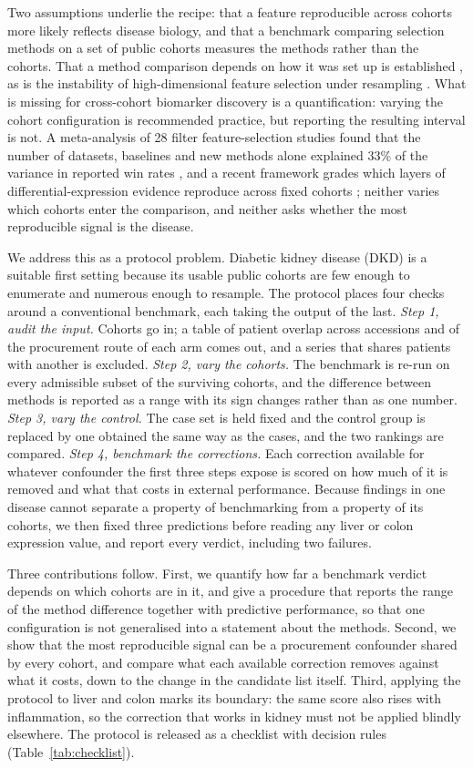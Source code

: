 \documentclass[unnumsec,webpdf,contemporary,large,numbered]{oup-authoring-template}
\begin{document}
Two assumptions underlie the recipe: that a feature reproducible across cohorts more likely
reflects disease biology, and that a benchmark comparing selection methods on a set of public
cohorts measures the methods rather than the cohorts. That a method comparison depends on how it
was set up is established \cite{boulesteix2013,jelizarow2010,ullmann2023,weber2019,mangul2019,norel2011,dehghani2021},
as is the instability of high-dimensional feature selection under resampling \cite{haury2011}.
What is missing for cross-cohort biomarker discovery is a quantification: varying the cohort
configuration is recommended practice, but reporting the resulting interval is not. A meta-analysis
of 28 filter feature-selection studies found that the number of datasets, baselines and new methods
alone explained 33\% of the variance in reported win rates \cite{ebiele2026}, and a recent
framework grades which layers of differential-expression evidence reproduce across fixed cohorts
\cite{angelakis2026}; neither varies which cohorts enter the comparison, and neither asks whether
the most reproducible signal is the disease.

We address this as a protocol problem. Diabetic kidney disease (DKD) is a suitable first setting
because its usable public cohorts are few enough to enumerate and numerous enough to resample.
The protocol places four checks around a conventional benchmark, each taking the
output of the last. \textit{Step 1, audit the input.} Cohorts go in; a table of patient overlap
across accessions and of the procurement route of each arm comes out, and a series that shares
patients with another is excluded. \textit{Step 2, vary the cohorts.} The benchmark is re-run on
every admissible subset of the surviving cohorts, and the difference between methods is reported
as a range with its sign changes rather than as one number. \textit{Step 3, vary the control.}
The case set is held fixed and the control group is replaced by one obtained the same way as the
cases, and the two rankings are compared. \textit{Step 4, benchmark the corrections.} Each
correction available for whatever confounder the first three steps expose is scored on how much
of it is removed and what that costs in external performance. Because findings in one disease cannot separate a
property of benchmarking from a property of its cohorts, we then fixed three predictions before
reading any liver or colon expression value, and report every verdict, including two failures.

Three contributions follow. First, we quantify how far a benchmark verdict depends on which
cohorts are in it, and give a procedure that reports the range of the method difference together
with predictive performance, so that one configuration is not generalised into a statement about
the methods. Second, we show that the most reproducible signal can be a procurement confounder
shared by every cohort, and compare what each available correction removes against what it
costs, down to the change in the candidate list itself. Third, applying the protocol to liver and
colon marks its boundary: the same score also rises with inflammation, so the correction that
works in kidney must not be applied blindly elsewhere. The protocol is released as a checklist
with decision rules (Table~\ref{tab:checklist}).
\end{document}

